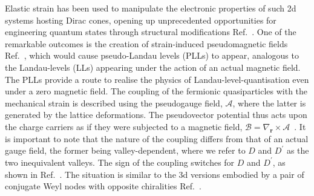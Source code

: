 \documentclass[aps,prb, onecolumn, nofootinbib, citeautoscript,10pt]{revtex4-2}
\newcommand{\red}[1]{{\color{red}#1}}
\begin{document}
Elastic strain has been used to manipulate the electronic properties of such 2d systems hosting Dirac cones, opening up unprecedented opportunities for engineering quantum states through structural modifications Ref.~\cite{neto-strain-graphene, strain-2d, graphene-strain-review, graphene-strain-geim, graphene-strain-terms, graphene-pseudo0, graphene-pseudo}. One of the remarkable \red{outcomes is} the creation of strain-induced pseudomagnetic fields Ref.~\cite{graphene-pseudo0, graphene-pseudo, strained-dirac-franz, complex-LL-strained-graphene}, which would cause pseudo-Landau levels (PLLs) to appear, analogous to the Landau-levels (LLs) appearing under the action of an actual magnetic field. The PLLs provide a route to realise the physics of Landau-level-\red{quantisation} even under a zero magnetic field.\red{ The coupling} of the fermionic quasiparticles with the mechanical strain is described using the pseudogauge field, $\boldsymbol{\mathcal A}$, where the latter is generated by the lattice deformations. The pseudovector potential thus acts upon the charge carriers as if they were subjected to a magnetic field, $\boldsymbol{\mathcal B} = \nabla_{\boldsymbol r} \times \boldsymbol{\mathcal A}$~\cite{pikulin16_chiral, ips_rahul_ph_strain, azaz-disorder, ips-ruiz, ips-rsw-ph, ips-nlsm-strain}. It is important to note that the nature of the coupling differs from that of an actual gauge field, the former being valley-dependent, where we refer to $D$ and $D^\prime $ as the two inequivalent valleys. The sign of the coupling switches for $D$ and $D^\prime $, as shown in Ref.~\cite{strained-dirac-franz}. The situation is similar to the 3d versions embodied by a pair of conjugate Weyl nodes with opposite chiralities Ref.~\cite{pikulin16_chiral}.
\end{document}
